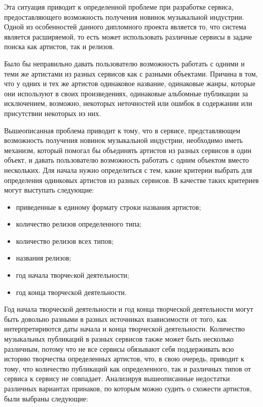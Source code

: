 Эта ситуация приводит к определенной проблеме при разработке сервиса, предоставляющего возможность получения новинок музыкальной индустрии. Одной из особенностей данного дипломного проекта является то, что система является расширяемой, то есть может использовать различные сервисы в задаче поиска как артистов, так и релизов.

Было бы неправильно давать пользователю возможность работать с одними и теми же артистами из разных сервисов как с разными объектами. Причина в том, что у одних и тех же артистов одинаковое название, одинаковые жанры, которые они используют в своих произведениях, одинаковые альбомные публикации за исключением, возможно, некоторых неточностей или ошибок в содержании или присутствии некоторых из них.

Вышеописанная проблема приводит к тому, что в сервисе, представляющем возможность получения новинок музыкальной индустрии, необходимо иметь механизм, который помогал бы объединять артистов из разных сервисов в один объект, и давать пользователю возможность работать с одним объектом вместо нескольких. Для начала нужно определиться с тем, какие критерии выбрать для определения одинковых артистов из разных сервисов. В качестве таких критериев могут выступать следующие:

\begin{itemize}
  \item приведенные к единому формату строки названия артистов;
  \item количество релизов определенного типа;
  \item количество релизов всех типов;
  \item названия релизов;
  \item год начала творчеcкой деятельности;
  \item год конца творческой деятельности.
\end{itemize}

Год начала творческой деятельности и год конца творческой деятельности могут быть довольно разными в разных источниках взависимости от того, как интерпретириются даты начала и конца творческой деятельности. Количество музыкальных публикаций в разных сервисов также может быть несколько различным, потому что не все сервисы обязывают себя поддерживать всю историю творчества определенных артистов, что, в свою очередь, приводит к тому, что количество публикаций как определенного, так и различных типов от сервиса к сервису не совпадает. Анализируя вышеописанные недостатки различных вариантах принаков, по которым можно судить о схожести артистов, были выбраны следующие:

